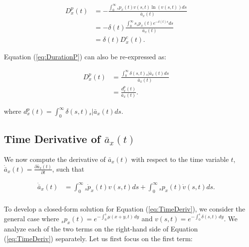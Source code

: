 \documentclass[12pt]{article}
\begin{document}
{\begin{equation}\label{eq:DurationCP}
\begin{split}
{D}^{p}_{x}(t) &= -\frac{\int_0^\infty {}_sp_x(t) v(s,t) \ln(v(s,t))ds}  {\bar{a}_x(t)} \\
&=- \delta(t)\frac{\int_0^\infty s{}_sp_x(t) e^{-\delta(t)s}  ds}{\bar{a}_x(t)} \\
& = \delta(t){D}^{c}_{x}(t).
\end{split}
\end{equation}

Equation (\ref{eq:DurationP}) can also be re-expressed as:

\begin{equation}\label{eq:DurationP2}
\begin{split}
{D}^{p}_{x}(t) &= \frac{\int_0^\infty \delta(s,t) {}_s|\bar{a}_x(t)ds} {\bar{a}_x(t)} \\
                 &= \frac{{d}^{p}_{x}(t)}{\bar{a}_x(t)}.
\end{split}
\end{equation}


where ${d}^{p}_{x}(t)=\int_0^\infty \delta(s,t) {}_s|\bar{a}_x(t) ds$. 

\subsection{Time Derivative of $\bar{a}_x(t)$} \label{sec:timderiv}

We now compute the derivative of $\bar{a}_x(t)$ with respect to the time variable $t$, $\dot{\bar{a}} _x(t)=\frac{\partial \bar{a}_x(t)}{\partial t}$, such that

\begin{equation}\label{eq:TimeDeriv}
\begin{split}
\dot{\bar{a}} _x(t) &= \int_0^\infty {}_s\dot{p}_x(t) v(s,t)ds +\int_0^\infty {}_sp_x(t) \dot{v}(s,t)ds.\\
\end{split}
\end{equation}


To develop a closed-form solution for Equation (\ref{eq:TimeDeriv}), we consider the general case where $_s p_x(t) = e^{-\int_{0}^{s} \mu(x+y,t) \, dy}$ and ${v}(s,t) = e^{-\int_{0}^{s} \delta(s,t) \, dy}$. We analyze each of the two terms on the right-hand side of Equation (\ref{eq:TimeDeriv}) separately. Let us first focus on the first term:


}
\end{document}

